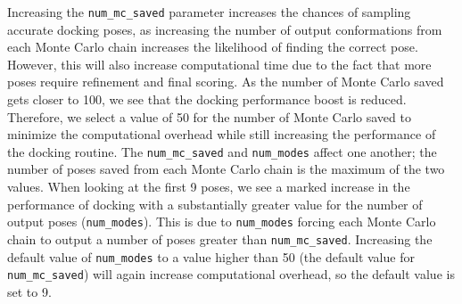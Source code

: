 \documentclass[journal=jcisd8,manuscript=article]{achemso}
\begin{document}
Increasing the \texttt{num\_mc\_saved} parameter increases the chances of sampling accurate docking poses, as increasing the number of output conformations from each Monte Carlo chain increases the likelihood of finding the correct pose. However, this will also increase computational time due to the fact that more poses require refinement and final scoring. As the number of Monte Carlo saved gets closer to 100, we see that the docking performance boost is reduced. Therefore, we select a value of 50 for the number of Monte Carlo saved to minimize the computational overhead while still increasing the performance of the docking routine. The \texttt{num\_mc\_saved} and \texttt{num\_modes} affect one another; the number of poses saved from each Monte Carlo chain is the maximum of the two values. When looking at the first 9 poses, we see a marked increase in the performance of docking with a substantially greater value for the number of output poses (\texttt{num\_modes}). This is due to \texttt{num\_modes} forcing each Monte Carlo chain to output a number of poses greater than \texttt{num\_mc\_saved}. Increasing the default value of \texttt{num\_modes} to a value higher than 50 (the default value for \texttt{num\_mc\_saved}) will again increase computational overhead, so the default value is set to 9. 
\end{document}
